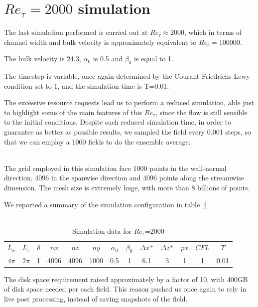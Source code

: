 \section{$Re_{\tau}=2000$ simulation} 
The last simulation performed is carried out at $Re_{\tau}\approx2000$, which in terms of channel width and bulk velocity is approximately equivalent to $Re_{b}=100000$.\par
The bulk velocity is 24.3, $\alpha_{0}$ is 0.5 and $\beta_{0}$ is equal to 1.\par
The timestep is variable, once again determined by the Courant-Friedrichs-Lewy condition set to 1, and the simulation time is T=0.01. \par
The excessive resource requests lead us to perform a reduced simulation, able just to highlight some of the main features of this $Re_{\tau}$, since the flow is still sensible to the initial conditions. Despite such reduced simulation time, in order to guarantee as better as possible results, we sampled the field every 0.001 steps, so that we can employ a 1000 fields to do the ensemble average.\\~\par
The grid employed in this simulation face 1000 points in the wall-normal direction, 4096 in the spanwise direction and 4096 points along the streamwise dimension. The mesh size is extremely huge, with more than 8 billions of points.\par
We reported a summary of the simulation configuration in table~\ref{table:2000}\\~\par

\begin{table}
\caption{Simulation data for $Re_{\tau}$=2000}
\begin{center}
\begin{tabular}{ccccccccccccc}
\toprule
$L_{x}$ & $L_{z}$ & $\delta$ & $nx$ & $nz$ & $ny$ & $\alpha_{0}$ & $\beta_{0}$ & $\Delta x^{+}$ & $\Delta z^{+}$ & $px$ & $CFL$ & $T$\\
$4\pi$ & $2\pi$ & 1 & 4096 & 4096 & 1000 & 0.5 & 1 & 6.1  & 3 & 1 & 1 & 0.01 \\
\bottomrule
\end{tabular}
\end{center}
\label{table:2000}
\end{table}


The disk space requirement raised approximately by a factor of 10, with 400GB of disk space needed per each field. This reason pushed us once again to rely in live post processing, instead of saving snapshots of the field.\\~\par

